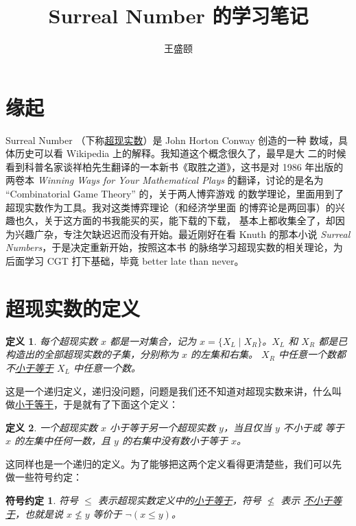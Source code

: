 \documentclass[cs4size,a4paper,adobefonts]{ctexart}
\newtheorem{defn}{定义}
\newcommand{\pname}[1]{\underline{#1}}
\numberwithin{equation}{section}
\begin{document}
\title{\bfseries Surreal Number 的学习笔记}
\author{王盛颐}
\date{}
\maketitle
\section{缘起}

Surreal Number （下称\pname{超现实数}）是 John Horton Conway 创造的一种
数域，具体历史可以看 Wikipedia 上的解释。我知道这个概念很久了，最早是大
二的时候看到科普名家谈祥柏先生翻译的一本新书《取胜之道》，这书是对
1986 年出版的两卷本 \textit{Winning Ways for Your Mathematical Plays}
的翻译，讨论的是名为 ``Combinatorial Game Theory'' 的，关于两人博弈游戏
的数学理论，里面用到了超现实数作为工具。我对这类博弈理论（和经济学里面
  的博弈论是两回事）的兴趣也久，关于这方面的书我能买的买，能下载的下载，
基本上都收集全了，却因为兴趣广杂，专注欠缺迟迟而没有开始。最近刚好在看
Knuth 的那本小说 \textit{Surreal Numbers}，于是决定重新开始，按照这本书
的脉络学习超现实数的相关理论，为后面学习 CGT 打下基础，毕竟 better
late than never。

\section{超现实数的定义}
\begin{defn}
  \label{defnSurreal}
  每个超现实数 $x$ 都是一对集合，记为 $x=\{X_L \mid X_R\}$。$X_L$ 和
  $X_R$ 都是已构造出的全部超现实数的子集，分别称为 $x$ 的左集和右集。
  $X_R$ 中任意一个数都不\pname{小于等于} $X_L$ 中任意一个数。
\end{defn}

这是一个递归定义，递归没问题，问题是我们还不知道对超现实数来讲，什么叫
做\pname{小于等于}，于是就有了下面这个定义：

\begin{defn}
  \label{defnLeq}
  一个超现实数 $x$ 小于等于另一个超现实数 $y$，当且仅当 $y$ 不小于或
  等于 $x$ 的左集中任何一数，且 $y$ 的右集中没有数小于等于 $x$。
\end{defn}

这同样也是一个递归的定义。为了能够把这两个定义看得更清楚些，我们可以先
做一些符号约定：

\newtheorem*{symbolDef}{符号约定}
\begin{symbolDef}
  符号 $\leq$ 表示超现实数定义中的\pname{小于等于}，符号 $\nleq$ 表示
  \pname{不小于等于}，也就是说 $x \nleq y$ 等价于 $\neg(x \leq y)$。
\end{symbolDef}
\end{document}

